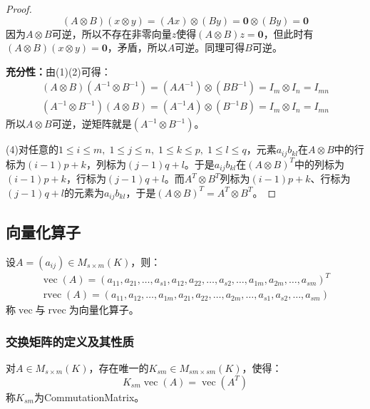 \begin{proof}
\begin{equation*}
		(A\otimes B)(x\otimes y)=(Ax)\otimes(By)=\mathbf{0}\otimes(By)=\mathbf{0}
	\end{equation*}
	因为$A\otimes B$可逆，所以不存在非零向量$z$使得$(A\otimes B)z=\mathbf{0}$，但此时有$(A\otimes B)(x\otimes y)=\mathbf{0}$，矛盾，所以$A$可逆。同理可得$B$可逆。\par
	\textbf{充分性：}由(1)(2)可得：
	\begin{gather*}
		(A\otimes B)(A^{-1}\otimes B^{-1})=(AA^{-1})\otimes(BB^{-1})=I_m\otimes I_n=I_{mn} \\
		(A^{-1}\otimes B^{-1})(A\otimes B)=(A^{-1}A)\otimes(B^{-1}B)=I_m\otimes I_n=I_{mn}
	\end{gather*}
	所以$A\otimes B$可逆，逆矩阵就是$(A^{-1}\otimes B^{-1})$。\par
	(4)对任意的$1\leqslant i\leqslant m,\;1\leqslant j\leqslant n,\;1\leqslant k\leqslant p,\;1\leqslant l\leqslant q$，元素$a_{ij}b_{kl}$在$A\otimes B$中的行标为$(i-1)p+k$，列标为$(j-1)q+l$。于是$a_{ij}b_{kl}$在$(A\otimes B)^T$中的列标为$(i-1)p+k$，行标为$(j-1)q+l$。而$A^T\otimes B^T$列标为$(i-1)p+k$、行标为$(j-1)q+l$的元素为$a_{ij}b_{kl}$，于是$(A\otimes B)^T=A^T\otimes B^T$。
\end{proof}
\subsection{向量化算子}
\begin{definition}
	设$A=(a_{ij})\in M_{s\times m}(K)$，则：
	\begin{gather*}
		\operatorname{vec}(A)=(a_{11},a_{21},\dots,a_{s1},a_{12},a_{22},\dots,a_{s2},\dots,a_{1m},a_{2m},\dots,a_{sm})^T \\
		\operatorname{rvec}(A)=(a_{11},a_{12},\dots,a_{1m},a_{21},a_{22},\dots,a_{2m},\dots,a_{s1},a_{s2},\dots,a_{sm})
	\end{gather*}
	称$\operatorname{vec}$与$\operatorname{rvec}$为向量化算子。
\end{definition}
\subsubsection{交换矩阵的定义及其性质}
\begin{definition}
	对$A\in M_{s\times m}(K)$，存在唯一的$K_{sm}\in M_{sm\times sm}(K)$，使得：
	\begin{equation*}
		K_{sm}\operatorname{vec}(A)=\operatorname{vec}(A^T)
	\end{equation*}
	称$K_{sm}$为\gls{CommutationMatrix}。
\end{definition}
